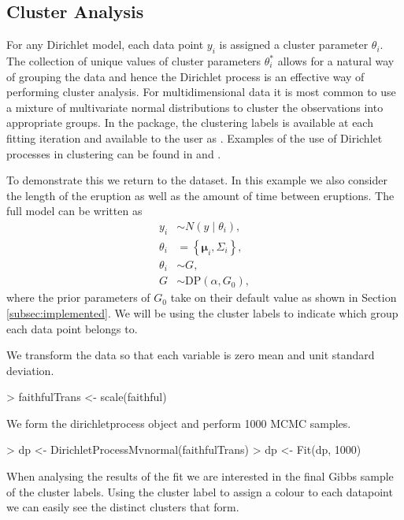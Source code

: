 \documentclass[nojss]{jss}
\begin{document}
\subsection{Cluster Analysis} \label{subsec:clusteranalysis}
For any Dirichlet model, each data point $y_i$ is assigned a cluster parameter $\theta _i$. The collection of unique values of cluster parameters $\theta _i ^*$ allows for a natural way of grouping the data and hence the Dirichlet process is an effective way of performing cluster analysis. For multidimensional data it is most common to use a mixture of multivariate normal distributions to cluster the observations into appropriate groups. In the  package, the clustering labels is available at each fitting iteration and available to the user as . Examples of the use of Dirichlet processes in clustering can be found in \cite{teh_sharing_2005} and \cite{kim_variable_2006}.

To demonstrate this we return to the  dataset. In this example we also consider the length of the eruption as well as the amount of time between eruptions. The full model can be written as
\begin{align*}
y _i & \sim N (y \mid \theta_i ), \\
\theta_i & =  \left\lbrace \boldsymbol{\mu}_i, \Sigma _i \right\rbrace , \\
\theta _i & \sim G, \\
G & \sim \text{DP} ( \alpha, G_0 ),
\end{align*}
where the prior parameters of $G_0$ take on their default value as shown in Section \ref{subsec:implemented}. We will be using the cluster labels to indicate which group each data point belongs to.

We transform the data so that each variable is zero mean and unit standard deviation.
\begin{Schunk}
\begin{Sinput}
> faithfulTrans <- scale(faithful)
\end{Sinput}
\end{Schunk}
We form the dirichletprocess object and perform 1000 MCMC samples.
\begin{Schunk}
\begin{Sinput}
> dp <-  DirichletProcessMvnormal(faithfulTrans)
> dp <- Fit(dp, 1000)
\end{Sinput}
\end{Schunk}
When analysing the results of the fit we are interested in the final Gibbs sample of the cluster labels. Using the cluster label to assign a colour to each datapoint we can easily see the distinct clusters that form.
\end{document}
